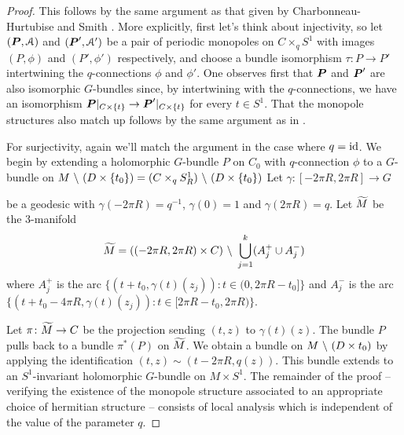 \documentclass[10pt, oneside]{article}
\begin{document}
\begin{proof}
This follows by the same argument as that given by Charbonneau-Hurtubise \cite{CharbonneauHurtubise} and Smith \cite{Smith}.  More explicitly, first let's think about injectivity, so let $(\boldsymbol{P}, \mathcal{A})$ and $(\boldsymbol{P}', \mathcal{A}')$ be a pair of periodic monopoles on $C \times_q S^1$ with images $(P,\phi)$ and $(P', \phi')$ respectively, and choose a bundle isomorphism $\tau \colon P \to P'$ intertwining the $q$-connections $\phi$ and $\phi'$.  One observes first that $\boldsymbol{P}$ and $\boldsymbol{P}'$ are also isomorphic $G$-bundles since, by intertwining with the $q$-connections, we have an isomorphism $\boldsymbol{P}|_{C \times \{t\}} \to \boldsymbol{P}'|_{C \times \{t\}}$ for every $t \in S^1$.  That the monopole structures also match up follows by the same argument as in \cite[Proposition 4.7]{CharbonneauHurtubise}.

For surjectivity, again we'll match the argument in the case where $q=\operatorname{id}$.  We begin by extending a holomorphic $G$-bundle $P$ on $C_0$ with $q$-connection $\phi$ to a $G$-bundle on $M \ \backslash \  (D \times \{t_0\}) = (C \times_q S^1_R) \ \backslash \  (D \times \{t_0\})$  Let $\gamma \colon [-2\pi R,2\pi R] \to G$ 

be a geodesic with $\gamma(-2\pi R) = q^{-1}$, $\gamma(0)=1$ and $\gamma(2\pi R) = q$.  Let $\widetilde{M}$ be the 3-manifold
\[\widetilde{M} = ((-2\pi R, 2\pi R) \times C) \ \backslash \  \bigcup_{j=1}^k (A^+_j \cup A^-_j)\]
where $A^+_j$ is the arc $\{(t+ t_0,\gamma(t)(z_j)) \colon t \in (0, 2\pi R - t_0]\}$ and $A^-_j$ is the arc $\{(t + t_0 - 4 \pi R,\gamma(t)(z_j)) \colon t \in [2\pi R-t_0, 2 \pi R)\}$.

Let $\pi \colon \widetilde{M} \to C$ be the projection sending $(t,z)$ to $\gamma(t)(z)$.  The bundle $P$ pulls back to a bundle $\pi^*(P)$ on $\widetilde{M}$.  We obtain a bundle on $M \ \backslash \  (D \times t_0)$ by applying the identification $(t,z) \sim (t - 2 \pi R, q(z))$.  This bundle extends to an $S^1$-invariant holomorphic $G$-bundle on $M \times S^1$.  The remainder of the proof -- verifying the existence of the monopole structure associated to an appropriate choice of hermitian structure -- consists of local analysis which is independent of the value of the parameter $q$. 


\end{proof}
\end{document}
